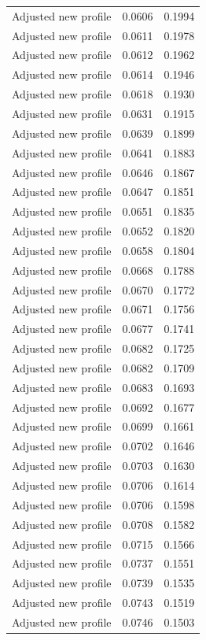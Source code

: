 \begin{table}[htbp]
\begin{tabular}{lll}
Adjusted new profile & 0.0606 & 0.1994 \\
Adjusted new profile & 0.0611 & 0.1978 \\
Adjusted new profile & 0.0612 & 0.1962 \\
Adjusted new profile & 0.0614 & 0.1946 \\
Adjusted new profile & 0.0618 & 0.1930 \\
Adjusted new profile & 0.0631 & 0.1915 \\
Adjusted new profile & 0.0639 & 0.1899 \\
Adjusted new profile & 0.0641 & 0.1883 \\
Adjusted new profile & 0.0646 & 0.1867 \\
Adjusted new profile & 0.0647 & 0.1851 \\
Adjusted new profile & 0.0651 & 0.1835 \\
Adjusted new profile & 0.0652 & 0.1820 \\
Adjusted new profile & 0.0658 & 0.1804 \\
Adjusted new profile & 0.0668 & 0.1788 \\
Adjusted new profile & 0.0670 & 0.1772 \\
Adjusted new profile & 0.0671 & 0.1756 \\
Adjusted new profile & 0.0677 & 0.1741 \\
Adjusted new profile & 0.0682 & 0.1725 \\
Adjusted new profile & 0.0682 & 0.1709 \\
Adjusted new profile & 0.0683 & 0.1693 \\
Adjusted new profile & 0.0692 & 0.1677 \\
Adjusted new profile & 0.0699 & 0.1661 \\
Adjusted new profile & 0.0702 & 0.1646 \\
Adjusted new profile & 0.0703 & 0.1630 \\
Adjusted new profile & 0.0706 & 0.1614 \\
Adjusted new profile & 0.0706 & 0.1598 \\
Adjusted new profile & 0.0708 & 0.1582 \\
Adjusted new profile & 0.0715 & 0.1566 \\
Adjusted new profile & 0.0737 & 0.1551 \\
Adjusted new profile & 0.0739 & 0.1535 \\
Adjusted new profile & 0.0743 & 0.1519 \\
Adjusted new profile & 0.0746 & 0.1503 \\

\end{tabular}
\end{table}

